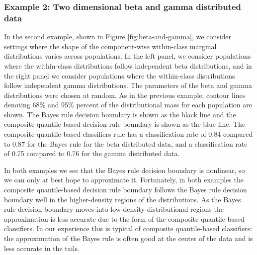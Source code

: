 \subsubsection*{Example 2:  Two dimensional beta and gamma distributed data}
\label{sec:beta-gamma-example}

In the second example, shown in Figure \ref{fig:beta-and-gamma}, we consider
settings where the shape of the component-wise within-class marginal
distributions varies across populations.  In the left panel, we consider
populations where the within-class distributions follow independent beta
distributions, and in the right panel we consider populations where the
within-class distributions follow independent gamma distributions.  The
parameters of the beta and gamma distributions were chosen at random.  As in the
previous example, contour lines denoting 68\% and 95\% percent of the
distributional mass for each population are shown.  The Bayes rule decision
boundary is shown as the black line and the composite quantile-based decision
rule boundary is shown as the blue line.  The composite quantile-based
classifiers rule has a classification rate of 0.84 compared to 0.87 for the
Bayes rule for the beta distributed data, and a classification rate of 0.75
compared to 0.76 for the gamma distributed data.

In both examples we see that the Bayes rule decision boundary is nonlinear, so
we can only at best hope to approximate it.  Fortunately, in both examples the
composite quantile-based decision rule boundary follows the Bayes rule decision
boundary well in the higher-density regions of the distributions.  As the Bayes
rule decision boundary moves into low-density distributional regions the
approximation is less accurate due to the form of the composite quantile-based
classifiers.  In our experience this is typical of composite quantile-based
classifiers: the approximation of the Bayes rule is often good at the center of
the data and is less accurate in the tails.


